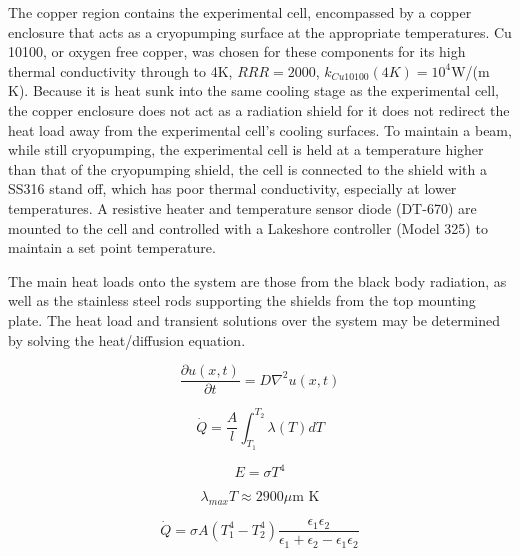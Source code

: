 The copper region contains the experimental cell, encompassed by a copper enclosure that acts as a cryopumping surface at the appropriate temperatures. Cu 10100, or oxygen free copper, was chosen for these components for its high thermal conductivity through to 4K, $RRR=2000$, $k_{Cu10100}(4K) = 10^4$W/(m K)\cite{NIST}. Because it is heat sunk into the same cooling stage as the experimental cell, the copper enclosure does not act as a radiation shield for it does not redirect the heat load away from the experimental cell's cooling surfaces. To maintain a beam, while still cryopumping, the experimental cell is held at a temperature higher than that of the cryopumping shield, the cell is connected to the shield with a SS316 stand off, which has poor thermal conductivity, especially at lower temperatures. A resistive heater and temperature sensor diode (DT-670) are mounted to the cell and controlled with a Lakeshore controller (Model 325) to maintain a set point temperature.

The main heat loads onto the system are those from the black body radiation, as well as the stainless steel rods supporting the shields from the top mounting plate. The heat load and transient solutions over the system may be determined by solving the heat/diffusion equation.

\begin{equation}
	\frac{\partial u(x, t)}{\partial t} = D \nabla^2 u(x, t)
\end{equation}

\begin{equation}
	\dot{Q} = \frac{A}{l}\int_{T_1}^{T_2} \lambda(T) dT
\end{equation}

\begin{equation}
	E = \sigma T^4
\end{equation}

\begin{equation}
	\lambda_{max}T \approx 2900\mu \text{m K}
\end{equation}

\begin{equation}
	\dot{Q} = \sigma A (T_1^4 - T_2^4)\frac{\epsilon_1 \epsilon_2}{\epsilon_1 + \epsilon_2 - \epsilon_1 \epsilon_2}
\end{equation}